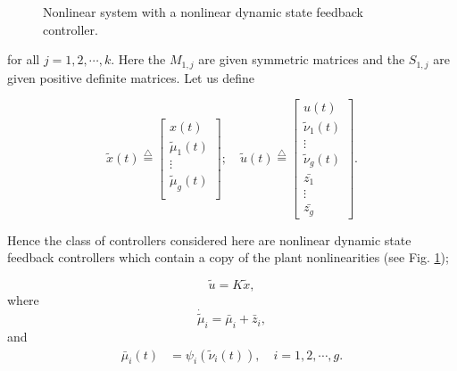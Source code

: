 \documentclass[twocolumn]{autart}
\newcommand{\eqdef}{\stackrel{\triangle}{=}}
\begin{document}
\begin{figure}[t]
\begin{center}
\caption{Nonlinear system with a nonlinear dynamic state feedback  controller.}
\label{fig:nonlinear}
\end{center}
\end{figure}
\noindent for all $j=1,2, \cdots, k$. Here the $M_{1,j}$ are given symmetric matrices and the $S_{1,j}$ are given positive definite matrices. Let us define
\begin{small}
\begin{equation}
\label{eqnx}
\tilde{x}(t)\eqdef
\left[
\begin{array}{c}
x(t) \\
\tilde{\mu}_1(t)\\
\vdots\\
\tilde{\mu}_g(t)\\
\end{array}\right];\quad
\tilde{u}(t)\eqdef
\left[
\begin{array}{c}
u(t) \\
\tilde{\nu}_1(t)\\
\vdots\\
\tilde{\nu}_g(t)\\
\bar{z_1}\\
\vdots\\
\bar{z_g}
\end{array}\right].
\end{equation}
\end{small}

\noindent Hence the class of controllers considered here are nonlinear dynamic state feedback controllers which contain a copy of the plant nonlinearities (see Fig. \ref{fig:nonlinear});
\begin{small}
\begin{equation}
\label{eqnestimator}
\tilde{u}= K \tilde{x},
\end{equation}
where
\begin{equation}
\label{eqdotmu}
\dot{\tilde{\mu}}_i =\bar{\mu}_i+\bar{z}_i,
\end{equation}
and
\begin{equation}
\label{eqnon2}
\begin{split}
\bar{\mu}_i(t)&=\psi_i (\tilde{\nu}_i(t)), \quad i=1,2, \cdots, g.
\end{split}
\end{equation}
\end{small}
\end{document}

